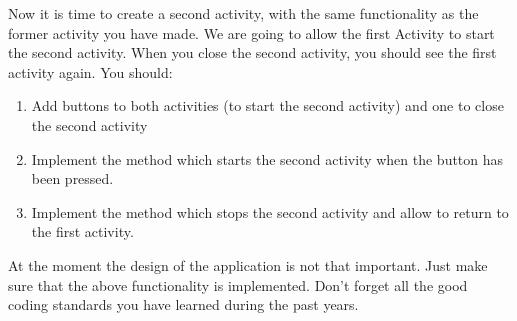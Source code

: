 \begin{exercise}
	Now it is time to create a second activity, with the same functionality as the former activity you have made. We are going to allow the first Activity to start the second activity. When you close the second activity, you should see the first activity again. You should:
	\begin{enumerate}
		\item Add buttons to both activities (to start the second activity) and one to close the second activity
		\item Implement the method which starts the second activity when the button has been pressed.
		\item Implement the method which stops the second activity and allow to return to the first activity.
	\end{enumerate}
\label{ex:act2}
\end{exercise}

At the moment the design of the application is not that important. Just make sure that the above functionality is implemented. Don't forget all the good coding standards you have learned during the past years.